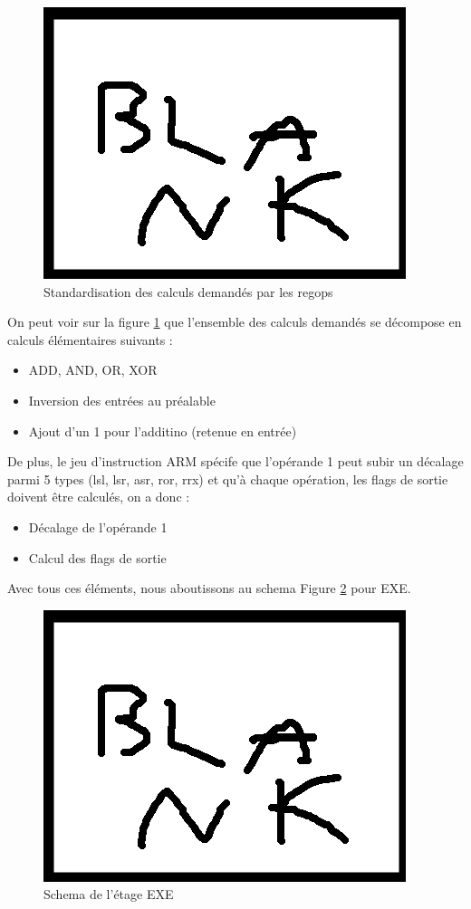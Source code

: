 \documentclass{report}
\begin{document}
\begin{figure}[h]
\includegraphics[scale=1]{pics/blank.png}
\centering
\caption{Standardisation des calculs demandés par les regops}
\label{standard}
\end{figure}

On peut voir sur la figure \ref{standard} que l'ensemble des calculs demandés se décompose
en calculs élémentaires suivants :
\begin{itemize}
  \item ADD, AND, OR, XOR
  \item Inversion des entrées au préalable
  \item Ajout d'un 1 pour l'additino (retenue en entrée)
\end{itemize}

De plus, le jeu d'instruction ARM spécife que l'opérande 1 peut subir un décalage
parmi 5 types (lsl, lsr, asr, ror, rrx) et qu'à chaque opération, les flags de sortie
doivent être calculés, on a donc :
\begin{itemize}
  \item Décalage de l'opérande 1
  \item Calcul des flags de sortie
\end{itemize}

Avec tous ces éléments, nous aboutissons au schema Figure \ref{exe} pour EXE.

\begin{figure}[h]
\includegraphics[scale=1]{pics/blank.png}
\centering
\caption{Schema de l'étage EXE}
\label{exe}
\end{figure}


\end{document}
